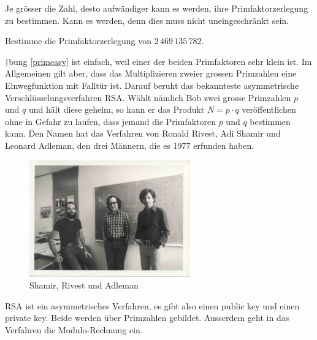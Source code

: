 \documentclass[%
<<<<<<< Updated upstream
11pt,%
twoside,%
titlepage,%
german,%
headsepline%
]{scrartcl}
\begin{document}
\begin{cdef}[Linksverschiebung]{}
\begin{cdef}{}
Je grösser die Zahl, desto aufwändiger kann es werden, ihre Primfaktorzerlegung zu bestimmen. Kann es werden, denn dies muss nicht uneingeschränkt sein.
\begin{ueb}\label{primeasy}
Bestimme die Primfaktorzerlegung von $2\,469\,135\,782$.
\end{ueb}
†bung \ref{primeasy} ist einfach, weil einer der beiden Primfaktoren sehr klein ist. Im Allgemeinen gilt aber, dass das Multiplizieren zweier grossen Primzahlen eine Einwegfunktion mit Falltür ist.
Darauf beruht das bekannteste asymmetrische Verschlüsselungsverfahren RSA. Wählt nämlich Bob zwei grosse Primzahlen $p$ und $q$ und hält diese geheim, so kann er das Produkt $N=p\cdot q$ veröffentlichen ohne in Gefahr zu laufen, dass jemand die Primfaktoren $p$ und $q$ bestimmen kann.
Den Namen hat das Verfahren von Ronald Rivest, Adi Shamir und Leonard Adleman, den drei Männern, die es 1977 erfunden haben.
\begin{figure}
\begin{center}
\includegraphics[width=0.618\textwidth]{pictures/rsaleute}
\end{center}
\caption{Shamir, Rivest und Adleman}
\end{figure}
RSA ist ein asymmetrisches Verfahren, es gibt also einen public key und einen private key. Beide werden über Primzahlen gebildet. Ausserdem geht in das Verfahren die Modulo-Rechnung ein.


\end{cdef}
\end{cdef}
\end{document}
